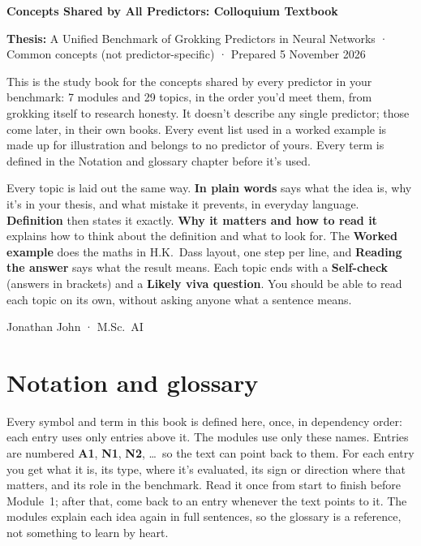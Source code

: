 \documentclass[11pt,a4paper,oneside,openany]{report}
\newcommand{\gl}[1]{\textbf{#1}}   %
\begin{document}
\begin{titlepage}
\raggedright
{\LARGE\bfseries Concepts Shared by All Predictors: Colloquium Textbook\par}
\vspace{6pt}
\textbf{Thesis:} A Unified Benchmark of Grokking Predictors in Neural Networks · Common concepts (not predictor-specific) · Prepared 5 November 2026
\vspace{14pt}

This is the study book for the concepts shared by every predictor in your benchmark: 7 modules and 29 topics, in the order you'd meet them, from grokking itself to research honesty. It doesn't describe any single predictor; those come later, in their own books. Every event list used in a worked example is made up for illustration and belongs to no predictor of yours. Every term is defined in the Notation and glossary chapter before it's used.

Every topic is laid out the same way. \textbf{In plain words} says what the idea is, why it's in your thesis, and what mistake it prevents, in everyday language. \textbf{Definition} then states it exactly. \textbf{Why it matters and how to read it} explains how to think about the definition and what to look for. The \textbf{Worked example} does the maths in H.K.\ Dass layout, one step per line, and \textbf{Reading the answer} says what the result means. Each topic ends with a \textbf{Self-check} (answers in brackets) and a \textbf{Likely viva question}. You should be able to read each topic on its own, without asking anyone what a sentence means.

\vspace{10pt}
Jonathan John · M.Sc.\ AI

\end{titlepage}

\tableofcontents
\clearpage
\chapter*{Notation and glossary}

Every symbol and term in this book is defined here, once, in dependency order: each entry uses only entries above it. The modules use only these names. Entries are numbered \gl{A1}, \gl{N1}, \gl{N2}, \ldots\ so the text can point back to them. For each entry you get what it is, its type, where it's evaluated, its sign or direction where that matters, and its role in the benchmark. Read it once from start to finish before Module~1; after that, come back to an entry whenever the text points to it. The modules explain each idea again in full sentences, so the glossary is a reference, not something to learn by heart.
\end{document}
